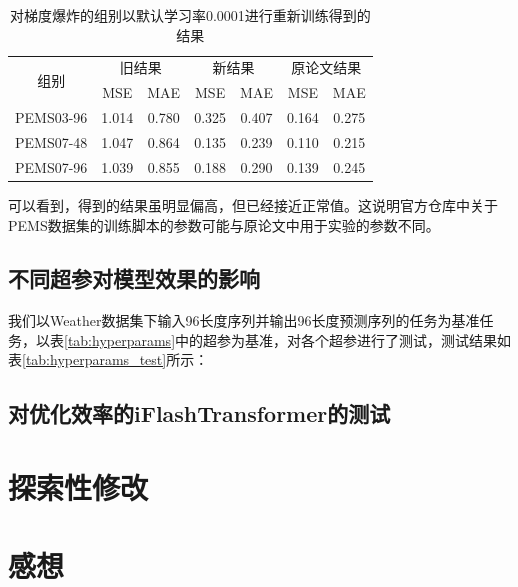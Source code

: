 \documentclass[twoside,12pt]{article}
\begin{document}
\begin{table}[htbp]
  \caption{对梯度爆炸的组别以默认学习率0.0001进行重新训练得到的结果}
  \label{tab:result_fix}
  \vspace{5pt}
  \centering
  \begin{tabular}{c|cc|cc|cc}
    \toprule
    \multirow{2}{*}{组别} & \multicolumn{2}{c|}{旧结果} & \multicolumn{2}{c|}{新结果} & \multicolumn{2}{c|}{原论文结果}                         \\
    \cmidrule(lr){2-3} \cmidrule(lr){4-5} \cmidrule(lr){6-7}
                          & MSE                         & MAE                         & MSE                             & MAE   & MSE   & MAE   \\
    \midrule
    PEMS03-96             & 1.014                       & 0.780                       & 0.325                           & 0.407 & 0.164 & 0.275 \\
    PEMS07-48             & 1.047                       & 0.864                       & 0.135                           & 0.239 & 0.110 & 0.215 \\
    PEMS07-96             & 1.039                       & 0.855                       & 0.188                           & 0.290 & 0.139 & 0.245 \\
    \bottomrule
  \end{tabular}
\end{table}

可以看到，得到的结果虽明显偏高，但已经接近正常值。这说明官方仓库中关于PEMS数据集的训练脚本的参数可能与原论文中用于实验的参数不同。

\subsection{不同超参对模型效果的影响}
我们以Weather数据集下输入96长度序列并输出96长度预测序列的任务为基准任务，以表\ref{tab:hyperparams}中的超参为基准，对各个超参进行了测试，测试结果如表\ref{tab:hyperparams_test}所示：


\subsection{对优化效率的iFlashTransformer的测试}



\section{探索性修改}


\section{感想}






\vfill
\end{document}
